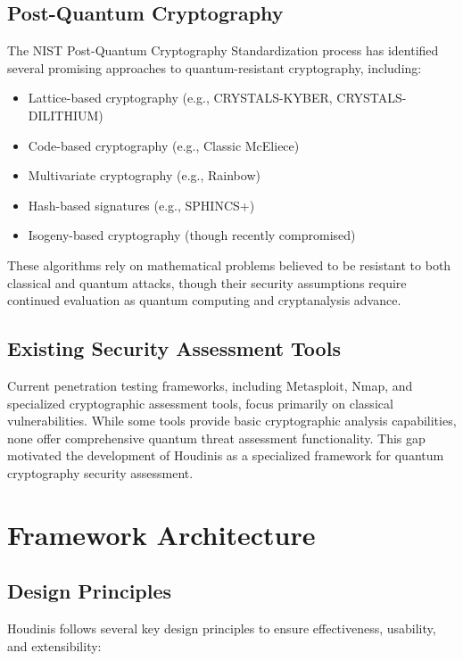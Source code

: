 \documentclass[11pt]{article}
\begin{document}
\subsection{Post-Quantum Cryptography}

The NIST Post-Quantum Cryptography Standardization process has identified several promising approaches to quantum-resistant cryptography, including:

\begin{itemize}
\item Lattice-based cryptography (e.g., CRYSTALS-KYBER, CRYSTALS-DILITHIUM)
\item Code-based cryptography (e.g., Classic McEliece)
\item Multivariate cryptography (e.g., Rainbow)
\item Hash-based signatures (e.g., SPHINCS+)
\item Isogeny-based cryptography (though recently compromised)
\end{itemize}

These algorithms rely on mathematical problems believed to be resistant to both classical and quantum attacks, though their security assumptions require continued evaluation as quantum computing and cryptanalysis advance.

\subsection{Existing Security Assessment Tools}

Current penetration testing frameworks, including Metasploit, Nmap, and specialized cryptographic assessment tools, focus primarily on classical vulnerabilities. While some tools provide basic cryptographic analysis capabilities, none offer comprehensive quantum threat assessment functionality. This gap motivated the development of Houdinis as a specialized framework for quantum cryptography security assessment.

\section{Framework Architecture}

\subsection{Design Principles}

Houdinis follows several key design principles to ensure effectiveness, usability, and extensibility:
\end{document}
